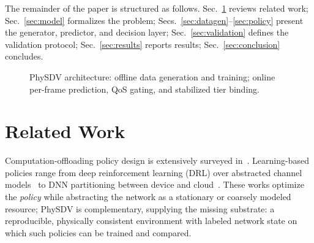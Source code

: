 \documentclass[10pt,conference]{IEEEtran}
\begin{document}
The remainder of the paper is structured as follows.
Sec.~\ref{sec:related} reviews related work; Sec.~\ref{sec:model}
formalizes the problem; Secs.~\ref{sec:datagen}--\ref{sec:policy}
present the generator, predictor, and decision layer;
Sec.~\ref{sec:validation} defines the validation protocol;
Sec.~\ref{sec:results} reports results; Sec.~\ref{sec:conclusion}
concludes.

\begin{figure}[t]
\centering
{}
\caption{PhySDV architecture: offline data generation and training;
online per-frame prediction, QoS gating, and stabilized tier binding.}
\label{fig:arch}
\end{figure}

\section{Related Work}\label{sec:related}

Computation-offloading policy design is extensively surveyed
in~\cite{mao2017survey,mach2017survey}.  Learning-based policies
range from deep reinforcement learning (DRL) over abstracted channel
models~\cite{chen2019offloading} to DNN partitioning between device and
cloud~\cite{kang2017neurosurgeon}.  These works optimize the
\emph{policy} while abstracting the network as a stationary or coarsely
modeled resource; PhySDV is complementary, supplying the missing
substrate: a reproducible, physically consistent environment with
labeled network state on which such policies can be trained and
compared.
\end{document}
